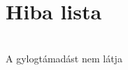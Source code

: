 \chapter{Hiba lista }
\hypertarget{bug}{}\label{bug}

\begin{DoxyRefList}
\item[{\parbox[t]{\linewidth}{Globális elem \doxylink{board_8c_a68e48836b74749c0896cfd02111c7cee}{b\+\_\+is\+\_\+attacked} (board brd, position pos, \doxylink{types_8h_a0a8ef1b5e1941b7257e545cc33405ff1}{color\+\_\+t} col)}}]\hfill \\
\label{bug__bug000001}%
%
A gylogtámadást nem látja 
\end{DoxyRefList}